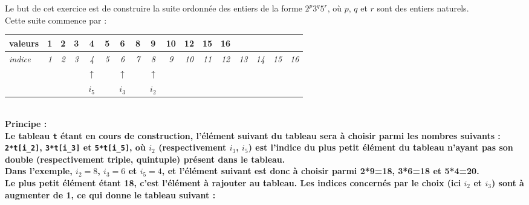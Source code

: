 \exer{}
\setcounter{numques}{0}

Le but de cet exercice est de construire la suite ordonnée des entiers
de la forme $2^p3^q5^r$, où $p$, $q$ et $r$ sont des entiers naturels.\\
Cette suite commence par :\\


\begin{tabular}{|l|c|c|c|c|c|c|c|c|c|c|c|c|c|c|c|c|}
 \hline
 valeurs&\bf 1&\bf 2&\bf 3&\bf 4&\bf 5&\bf 6&\bf 8&\bf 9&\bf 10&\bf
12&\bf 15&\bf 16&&&&\\ \hline
 \it indice&\it 1&\it 2&\it 3&\it 4&\it 5&\it 6&\it
7&\it 8&\it 9&\it 10&\it 11&\it 12&\it 13&\it 14&\it 15&\it 16 \rm\\ 
 \hline
\multicolumn{1}{c}{} &\multicolumn{1}{c}{}
&\multicolumn{1}{c}{} &\multicolumn{1}{c}{}
&\multicolumn{1}{c}{$\uparrow$}&\multicolumn{1}{c}{}
&\multicolumn{1}{c}{$\uparrow$}&\multicolumn{1}{c}{}
&\multicolumn{1}{c}{$\uparrow$} &\multicolumn{1}{c}{}&\multicolumn{1}{c}{}
&\multicolumn{1}{c}{}
&\multicolumn{1}{c}{} &\multicolumn{1}{c}{} &\multicolumn{1}{c}{}
&\multicolumn{1}{c}{} &\multicolumn{1}{c}{} \\
 \multicolumn{1}{c}{} &\multicolumn{1}{c}{} &\multicolumn{1}{c}{}
&\multicolumn{1}{c}{} &\multicolumn{1}{c}{$i_5$}&\multicolumn{1}{c}{}
&\multicolumn{1}{c}{$i_3$}&\multicolumn{1}{c}{}
&\multicolumn{1}{c}{$i_2$}&\multicolumn{1}{c}{} &\multicolumn{1}{c}{}
&\multicolumn{1}{c}{}
&\multicolumn{1}{c}{} &\multicolumn{1}{c}{} &\multicolumn{1}{c}{}
&\multicolumn{1}{c}{} &\multicolumn{1}{c}{} 
 \end{tabular}
\\

\noindent\bf Principe :\rm\\

Le tableau \texttt{t} étant en cours de construction, l'élément suivant du
tableau sera à choisir parmi les nombres suivants : \texttt{2*t[i\_2]},
\texttt{3*t[i\_3]} et \texttt{5*t[i\_5]}, où $i_2$ (respectivement $i_3$,
$i_5$) est l'indice du plus petit élément du tableau n'ayant pas son double
(respectivement triple, quintuple) présent dans le tableau.\\
Dans l'exemple, $i_2=8$, $i_3=6$ et $i_5=4$, et l'élément suivant est donc à
choisir parmi 2*9=18, 3*6=18 et 5*4=20.\\
Le plus petit élément étant 18, c'est l'élément à rajouter au tableau. Les
indices concernés par le choix (ici $i_2$ et $i_3$) sont à augmenter de 1, ce
qui donne le tableau suivant :\\


